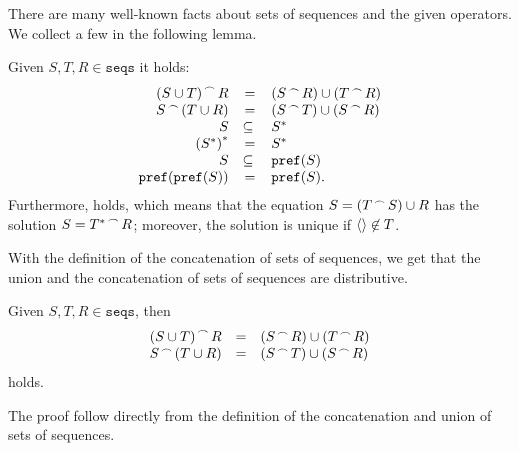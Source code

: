 \begin{old} %
There are many well-known facts about sets of sequences and the given operators. We collect a few in the following lemma.

\begin{lemma}[Properties]
\label{lem_seq_props}
	Given $S,T,R\in\texttt{seqs}$ it holds:
	\begin{align*}
		\begin{array}{rcl}
			{\left(S\cup{}T\right)}^{\,\frown{}\,}{R} &=& \left({S}^{\,\frown{}\,}{R}\right)\cup\left({T}^{\,\frown{}\,}{R}\right) \\
			{S}^{\,\frown{}\,}{\left(T\cup{}R\right)} &=& \left({S}^{\,\frown{}\,}{T}\right)\cup\left({S}^{\,\frown{}\,}{R}\right) \\
			S&\subseteq{}&S^*\\
			\left(S^*\right)^*&=&S^*\\
			S &\subseteq{}&\mathtt{pref}(S) \\
			\mathtt{pref}(\mathtt{pref}(S)) &=& \mathtt{pref}(S).
		\end{array}
	\end{align*}
Furthermore,  holds, which means that the equation $S=\left({T}^{\,\frown{}\,}{S}\right)\cup{}R$ has the solution $S={T^*}^{\,\frown{}\,}{R}$; moreover, the solution is unique if $\langle\rangle\not\in{}T$.
\end{lemma}
\end{old} %

With the definition of the concatenation of sets of sequences, we get that the union and the concatenation of sets of sequences are distributive.
\begin{lemma}[Distributivity]
\label{lem_seq_props}
	Given $S,T,R\in\texttt{seqs}$, then
	\begin{align*}
		\begin{array}{rcl}
			{\left(S\cup{}T\right)}^{\,\frown{}\,}{R} &=& \left({S}^{\,\frown{}\,}{R}\right)\cup\left({T}^{\,\frown{}\,}{R}\right) \\
			{S}^{\,\frown{}\,}{\left(T\cup{}R\right)} &=& \left({S}^{\,\frown{}\,}{T}\right)\cup\left({S}^{\,\frown{}\,}{R}\right) 
		\end{array}
	\end{align*}
	holds.
\end{lemma}
The proof follow directly from the definition of the concatenation and union of sets of sequences.
